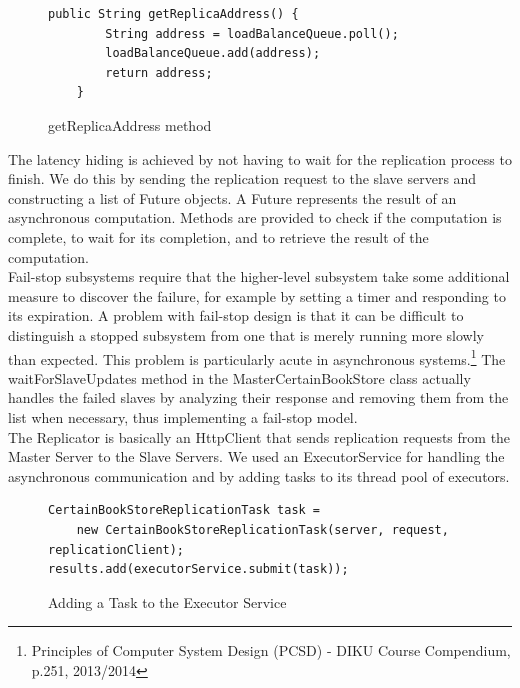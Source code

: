 \documentclass{article}      %
\begin{document}
\begin{figure}[htbp]
\begin{center}
\begin{lstlisting}
public String getReplicaAddress() {
		String address = loadBalanceQueue.poll();
		loadBalanceQueue.add(address);
		return address;
	}
\end{lstlisting}
\caption{getReplicaAddress method}
\label{getReplicaAddress method}
\end{center}
\end{figure}

The latency hiding is achieved by not having to wait for the replication process to finish. We do this by sending the replication request to the slave servers and constructing a list of Future objects. A Future represents the result of an asynchronous computation. Methods are provided to check if the computation is complete, to wait for its completion, and to retrieve the result of the computation. \\ 

Fail-stop subsystems require that the higher-level subsystem take some additional measure to discover the failure, for example by setting a timer and responding to its expiration. A problem with fail-stop design is that it can be difficult to distinguish a stopped subsystem from one that is merely running more slowly than expected. This problem is particularly acute in asynchronous systems.\footnote{Principles of Computer System Design (PCSD) - DIKU Course Compendium, p.251, 2013/2014} The waitForSlaveUpdates method in the MasterCertainBookStore class actually handles the failed slaves by analyzing their response and removing them from the list when necessary, thus implementing a fail-stop model. \\ 

The Replicator is basically an HttpClient that sends replication requests  from the Master Server to the Slave Servers. We used an ExecutorService for handling the asynchronous communication and by adding tasks to its thread pool of executors.\\

\begin{figure}[htbp]
\begin{center}
\begin{lstlisting}
CertainBookStoreReplicationTask task = 
	new CertainBookStoreReplicationTask(server, request, replicationClient);
results.add(executorService.submit(task));
\end{lstlisting}
\caption{Adding a Task to the Executor Service}
\label{Adding a Task to the Executor Service}
\end{center}
\end{figure}
\end{document}
